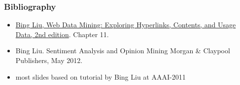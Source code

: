 \documentclass[t]{beamer}
\subtitle{Sentiment Analysis and Opinion Mining}
\begin{document}
\maketitle



\begin{frame} \frametitle{Bibliography}

    \begin{block}{}
        \begin{itemize}
            \item \href{http://www.cs.uic.edu/~liub/WebMiningBook.html}{Bing Liu, Web Data Mining: Exploring Hyperlinks, Contents, and
         Usage Data, 2nd edition}.  Chapter 11.
            \item Bing Liu. Sentiment Analysis and Opinion Mining Morgan \& Claypool Publishers, May 2012.
            \item most slides based on tutorial by Bing Liu at AAAI-2011
       \end{itemize}
    \end{block}

\end{frame}

\end{document}
